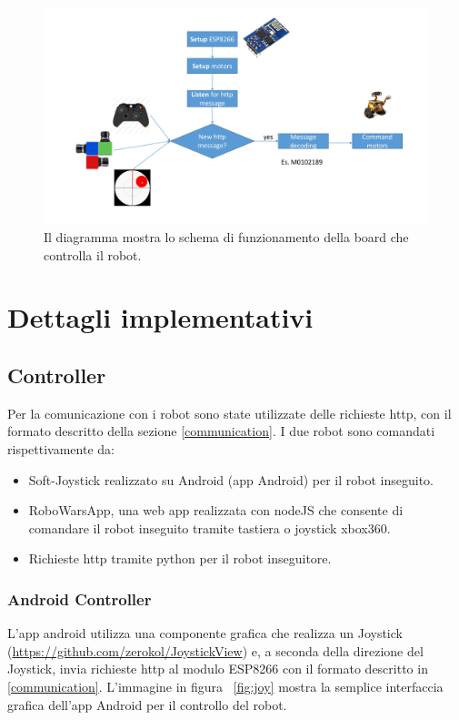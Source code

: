 \documentclass [11pt ,a4paper ,twoside ]{article}
\begin{document}
\begin{figure}
	\centering
		\hspace*{-4.9cm}\includegraphics[width=1.7\textwidth]{Images/img.pdf}
		\caption{Il diagramma mostra lo schema di funzionamento della board che controlla il robot.}
	\label{fig:img}
\end{figure}

\section{Dettagli implementativi}

\subsection{Controller}

Per la comunicazione con i robot sono state utilizzate delle richieste http, con il formato descritto della sezione \ref{communication}. I due robot sono comandati rispettivamente da:	
\begin{itemize}
\item Soft-Joystick realizzato su Android (app Android) per il robot inseguito.
\item RoboWarsApp, una web app realizzata con nodeJS che consente di comandare il robot inseguito tramite tastiera o joystick xbox360.
\item Richieste http tramite python per il robot inseguitore.
\end{itemize}

\subsubsection{Android Controller}
L'app android utilizza una componente grafica che realizza un Joystick (\url{https://github.com/zerokol/JoystickView}) e, a seconda della direzione del Joystick, invia richieste http al modulo ESP8266 con il formato descritto in \ref{communication}. L'immagine in figura ~\ref{fig:joy} mostra la semplice interfaccia grafica dell'app Android per il controllo del robot.
\end{document}
